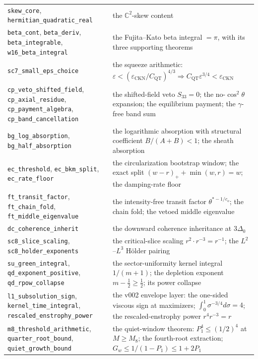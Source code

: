 \documentclass[11pt,letterpaper]{amsart}
\theoremstyle{definition}
\theoremstyle{remark}
\begin{document}
{\begin{longtable}{@{}>{\raggedright\arraybackslash}p{}p{}@{}}
\texttt{skew\_core}, \texttt{hermitian\_quadratic\_real} & the
$\mathbb{C}^2$-skew content \\
\texttt{beta\_cont}, \texttt{beta\_deriv}, \texttt{beta\_integrable},
\texttt{w16\_beta\_integral} & the Fujita--Kato beta integral $=\pi$, with its three
supporting theorems \\
\texttt{sc7\_small\_eps\_choice} & the squeeze arithmetic:
$\varepsilon<(\varepsilon_{\mathrm{CKN}}/C_{\mathrm{QT}})^{4/3}\Rightarrow
C_{\mathrm{QT}}\varepsilon^{3/4}<\varepsilon_{\mathrm{CKN}}$ \\
\texttt{cp\_veto\_shifted\_field}, \texttt{cp\_axial\_residue},
\texttt{cp\_payment\_algebra}, \texttt{cp\_band\_cancellation} & the shifted-field
veto $S_{33}=0$; the no-$\cos^2\theta$ expansion; the equilibrium payment; the
$\gamma$-free band sum \\
\texttt{bg\_log\_absorption}, \texttt{bg\_half\_absorption} & the logarithmic
absorption with structural coefficient $B/(A{+}B)<1$; the sheath absorption \\
\texttt{ec\_threshold}, \texttt{ec\_bkm\_split}, \texttt{ec\_rate\_floor} & the
circularization bootstrap window; the exact split $(w{-}r)_++\min(w,r)=w$; the
damping-rate floor \\
\texttt{ft\_transit\_factor}, \texttt{ft\_chain\_fold},
\texttt{ft\_middle\_eigenvalue} & the intensity-free transit factor
$\theta^{*-1/c_o}$; the chain fold; the vetoed middle eigenvalue \\
\texttt{dc\_coherence\_inherit} & the downward coherence inheritance at $3\Delta_0$ \\
\texttt{sc8\_slice\_scaling}, \texttt{sc8\_holder\_exponents} & the critical-slice
scaling $r^2\cdot r^{-3}=r^{-1}$; the $L^2$--$L^3$ H\"older pairing \\
\texttt{su\_green\_integral}, \texttt{qd\_exponent\_positive},
\texttt{qd\_rpow\_collapse} & the sector-uniformity kernel integral $1/(m{+}1)$; the
depletion exponent $m-\tfrac12\ge\tfrac12$; its power collapse \\
\texttt{l1\_subsolution\_sign},
\texttt{kernel\_time\_integral},
\texttt{rescaled\_enstrophy\_power} & the v002 envelope layer: the one-sided
viscous sign at maximizers; $\int_0^1\sigma^{-3/4}d\sigma=4$; the
rescaled-enstrophy power $r^4r^{-3}=r$ \\
\texttt{m8\_threshold\_arithmetic},
\texttt{quarter\_root\_bound},
\texttt{quiet\_growth\_bound} & the quiet-window theorem: $P_1^4\le(1/2)^4$ at
$M\ge M_8$; the fourth-root extraction; $G_w\le1/(1-P_1)\le1+2P_1$ \\

\end{longtable}}
\end{document}

